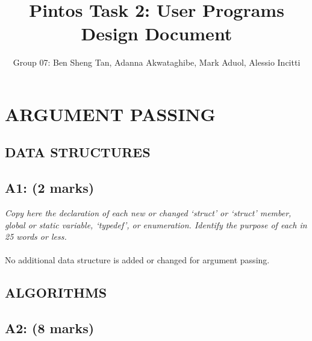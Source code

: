 \documentclass{article}
\title{Pintos Task 2: User Programs Design Document}
\author{Group 07: Ben Sheng Tan, Adanna Akwataghibe, Mark Aduol, Alessio Incitti }
\begin{document}
\maketitle

\section{ARGUMENT PASSING}

\subsection{ DATA STRUCTURES}

\subsection*{A1: (2 marks) }

\textit{Copy here the declaration of each new or changed ‘struct’ or ‘struct’ member, global or static variable, ‘typedef’, or enumeration. Identify the purpose of each in 25 words or less.}
\\ \\
No additional data structure is added or changed for argument passing.


\subsection{ALGORITHMS}

\subsection*{A2: (8 marks) }
\end{document}
